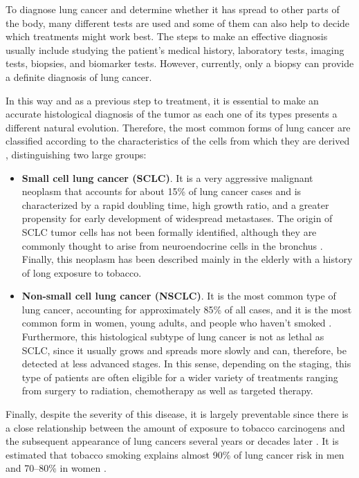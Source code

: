 To diagnose lung cancer and determine whether it has spread to other parts of the body, many different tests are used and some of them can also help to decide which treatments might work best. The steps to make an effective diagnosis usually include studying the patient's medical history, laboratory tests, imaging tests, biopsies, and biomarker tests. However, currently, only a biopsy can provide a definite diagnosis of lung cancer.

In this way and as a previous step to treatment, it is essential to make an accurate histological diagnosis of the tumor as each one of its types presents a different natural evolution. Therefore, the most common forms of lung cancer are classified according to the characteristics of the cells from which they are derived \cite{WHO}, distinguishing two large groups:
\begin{itemize}
    \item \textbf{Small cell lung cancer (SCLC)}. It is a very aggressive malignant neoplasm that accounts for about 15\% of lung cancer cases \cite{SCLC} and is characterized by a rapid doubling time, high growth ratio, and a greater propensity for early development of widespread metastases. The origin of SCLC tumor cells has not been formally identified, although they are commonly thought to arise from neuroendocrine cells in the bronchus \cite{SCLC_cell_orig}. Finally, this neoplasm has been described mainly in the elderly with a history of long exposure to tobacco.
    \item \textbf{Non-small cell lung cancer (NSCLC)}. It is the most common type of lung cancer, accounting for approximately 85\% of all cases, and it is the most common form in women, young adults, and people who haven't smoked \cite{NSCLC}. Furthermore, this histological subtype of lung cancer is not as lethal as SCLC, since it usually grows and spreads more slowly and can, therefore, be detected at less advanced stages. In this sense, depending on the staging, this type of patients are often eligible for a wider variety of treatments ranging from surgery to radiation, chemotherapy as well as targeted therapy.
\end{itemize}

Finally, despite the severity of this disease, it is largely preventable since there is a close relationship between the amount of exposure to tobacco carcinogens and the subsequent appearance of lung cancers several years or decades later \cite{Tobacco}. It is estimated that tobacco smoking explains almost 90\% of lung cancer risk in men and 70–80\% in women \cite{Smoking}.

